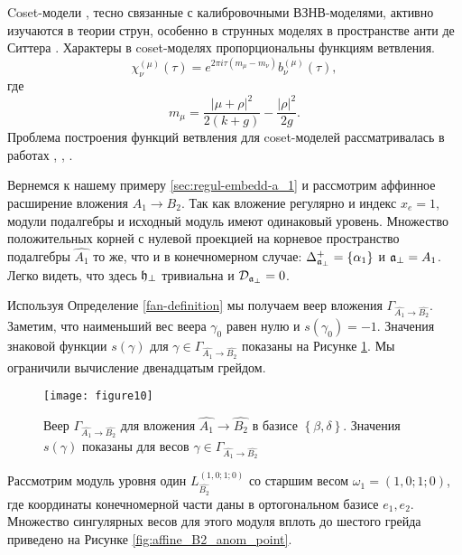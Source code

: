 Coset-модели \cite{Goddard198588}, тесно связанные с калибровочными ВЗНВ-моделями, активно изучаются в теории струн, особенно в струнных моделях в пространстве анти де Ситтера
\cite{Maldacena:2000hw,Maldacena:2000kv,Maldacena:2001km,Maldacena:2001ky,Aharony:1999ti}. Характеры в coset-моделях пропорциональны функциям ветвления.
\begin{equation}
  \label{eq:31}
  \chi^{(\mu)}_{\nu}(\tau)=e^{2\pi i \tau (m_{\mu}-m_{\nu})} b^{(\mu)}_{\nu}(\tau),
\end{equation}
где
\begin{equation*}
  \label{eq:46}
  m_{\mu}=\frac{\left|\mu+\rho\right|^2}{2(k+g)}-\frac{\left|\rho\right|^2}{2g}.
\end{equation*}
Проблема построения функций ветвления для  coset-моделей рассматривалась в работах  \cite{Dunbar:1992gh}, \cite{Hwang:1994yr}, \cite{lu1994branching}.

Вернемся к нашему примеру \ref{sec:regul-embedd-a_1} и рассмотрим аффинное расширение вложения $A_1 \rightarrow B_2$. Так как вложение регулярно и индекс $x_e=1$, модули подалгебры и исходный модуль имеют одинаковый уровень. Множество положительных корней с нулевой проекцией на корневое пространство подалгебры  $\hat{A_1}$ то же, что и в конечномерном случае: $\Delta^{+}_{\mathfrak{a}_{\perp}}=\left\{ \alpha_1 \right\}$ и $\mathfrak{a}_{\perp}=A_1$. Легко видеть, что здесь $\mathfrak{h}_{\perp}$ тривиальна и  ${\cal D}_{\mathfrak{a}_{\perp}}=0$.

Используя Определение \ref{fan-definition} мы получаем веер вложения $\Gamma_{\hat{A_1} \longrightarrow  \hat{B_2} }$. Заметим, что наименьший вес веера $\gamma_0$ равен нулю и  $s\left( \gamma_0 \right)=-1$. Значения знаковой функции  $s(\gamma)$ для $ \gamma \in \Gamma_{\hat{A_1} \longrightarrow  \hat{B_2} }$ показаны на Рисунке \ref{fig:AffineB2A1Fan}.
Мы ограничили вычисление двенадцатым грейдом. 
\begin{figure}[h!bt]
  \centering
  \texttt{[image: figure10]}
  \caption{Веер $\Gamma_{\hat{A_1}\rightarrow \hat{B_2}}$ для вложения $\hat{A_1}\rightarrow \hat{B_2}$ в базисе $\left\{\beta,\delta \right\}$. Значения $s(\gamma)$ показаны для весов $\gamma\in \Gamma_{\hat{A_1}\rightarrow \hat{B_2}}$}
  \label{fig:AffineB2A1Fan}
\end{figure}

Рассмотрим модуль уровня один $L^{\left( 1,0;1;0 \right)}_{\hat{B_2}}$  со старшим весом  $\omega_1=(1,0;1;0)$, где координаты конечномерной части даны в ортогональном базисе $e_1,e_2$. Множество сингулярных весов для этого модуля вплоть до шестого грейда приведено на Рисунке \ref{fig:affine_B2_anom_point}.

